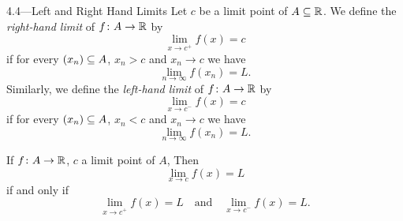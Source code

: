 \documentclass[class=article, crop=false]{standalone}
\begin{document}
  \begin{definition}{4.4---Left and Right Hand Limits}
    Let $c$ be a limit point of $A\subseteq\mathbb{R}$. We define the \emph{right-hand limit} of $f\colon A\to \mathbb{R}$ by
    \[
      \lim_{x\to c^+} f(x) = c
    \]
    if for every $(x_n)\subseteq A$, $x_n > c$ and $x_n\to c$ we have
    \[
      \lim_{n\to \infty} f(x_n) = L.
    \]
    Similarly, we define the \emph{left-hand limit} of $f\colon A\to \mathbb{R}$ by
    \[
      \lim_{x\to c^-} f(x) = c
    \]
    if for every $(x_n)\subseteq A$, $x_n < c$ and $x_n\to c$ we have
    \[
      \lim_{n\to \infty} f(x_n) = L.
    \]
  \end{definition}
  \begin{theorem}{4.5}
    If $f\colon A\to \mathbb{R}$, $c$ a limit point of $A$, Then
    \[
      \lim_{x\to c} f(x) = L \tag{exists}
    \]
    if and only if
    \[
      \lim_{x\to c^+} f(x) = L\quad \text{and}\quad \lim_{x\to c^-} f(x) = L.
    \]
  \end{theorem}
\end{document}
